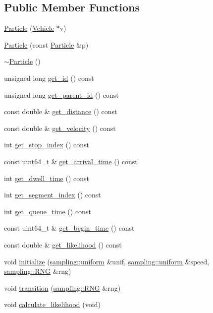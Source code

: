 \subsection*{Public Member Functions}
\begin{DoxyCompactItemize}
\item 
\hyperlink{classgtfs_1_1Particle_ad7f42e77c6c7f3042c977fd5a42ff82f}{Particle} (\hyperlink{classgtfs_1_1Vehicle}{Vehicle} $\ast$v)
\item 
\hyperlink{classgtfs_1_1Particle_ac386e64b43b1e317063f9a6666d604ce}{Particle} (const \hyperlink{classgtfs_1_1Particle}{Particle} \&p)
\item 
\hyperlink{classgtfs_1_1Particle_a3accf3496ad8460b4ad8b3f6da2de411}{$\sim$\+Particle} ()
\item 
unsigned long \hyperlink{classgtfs_1_1Particle_a3131eb93ac902a4cccf42061e1a7296b}{get\+\_\+id} () const
\item 
unsigned long \hyperlink{classgtfs_1_1Particle_a9372dbbfe702b9931b9eb1ee217afcba}{get\+\_\+parent\+\_\+id} () const
\item 
const double \& \hyperlink{classgtfs_1_1Particle_a0ec3ee5a83e778069946242a6d7731b6}{get\+\_\+distance} () const
\item 
const double \& \hyperlink{classgtfs_1_1Particle_a3b59c859c3445b97c6da6c0b9081b1e4}{get\+\_\+velocity} () const
\item 
int \hyperlink{classgtfs_1_1Particle_a322a6111d18ae304c0b22f000461076a}{get\+\_\+stop\+\_\+index} () const
\item 
const uint64\+\_\+t \& \hyperlink{classgtfs_1_1Particle_a783d1a0a614dc2c3f18cf269f69ede3d}{get\+\_\+arrival\+\_\+time} () const
\item 
int \hyperlink{classgtfs_1_1Particle_aaea44cde86b5b026c94800c6d837f174}{get\+\_\+dwell\+\_\+time} () const
\item 
int \hyperlink{classgtfs_1_1Particle_aad21b0ddaacd73940d4e987426b1fed0}{get\+\_\+segment\+\_\+index} () const
\item 
int \hyperlink{classgtfs_1_1Particle_a63bd83f650af8855f014e6e5f86a123a}{get\+\_\+queue\+\_\+time} () const
\item 
const uint64\+\_\+t \& \hyperlink{classgtfs_1_1Particle_ac4c8fd3566b0178c95daf6a0cba0040e}{get\+\_\+begin\+\_\+time} () const
\item 
const double \& \hyperlink{classgtfs_1_1Particle_a2e1a6de0b7d0fd6938ef3f7f9e5d4b99}{get\+\_\+likelihood} () const
\item 
void \hyperlink{classgtfs_1_1Particle_a4b1e356f32d4557d06c9ed59467a5b27}{initialize} (\hyperlink{classsampling_1_1uniform}{sampling\+::uniform} \&unif, \hyperlink{classsampling_1_1uniform}{sampling\+::uniform} \&speed, \hyperlink{classsampling_1_1RNG}{sampling\+::\+R\+NG} \&rng)
\item 
void \hyperlink{classgtfs_1_1Particle_a18aeb1ccbc395210f80c18f9d0a0095c}{transition} (\hyperlink{classsampling_1_1RNG}{sampling\+::\+R\+NG} \&rng)
\item 
void \hyperlink{classgtfs_1_1Particle_a88627efbe0eb2e289315ae82627d3a39}{calculate\+\_\+likelihood} (void)
\end{DoxyCompactItemize}
